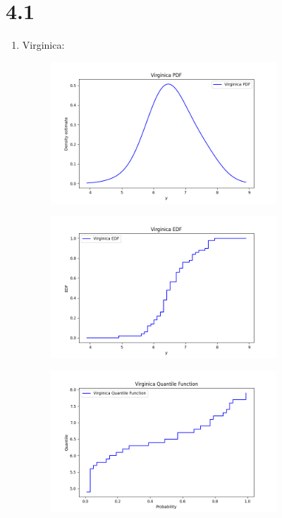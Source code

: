 \documentclass{article}
\begin{document}
\section*{4.1}
\begin{enumerate}
\item Virginica:
\begin{figure}[htbp]
    \centering
    \includegraphics[width=0.8\textwidth]{virginica_pdf.png}
\end{figure}
\begin{figure}[htbp]
    \centering
    \includegraphics[width=0.8\textwidth]{virginica_edf.png}
\end{figure}
\begin{figure}[htbp]
    \centering
    \includegraphics[width=0.8\textwidth]{virginica_quantile.png}

\end{figure}
\end{enumerate}
\end{document}
